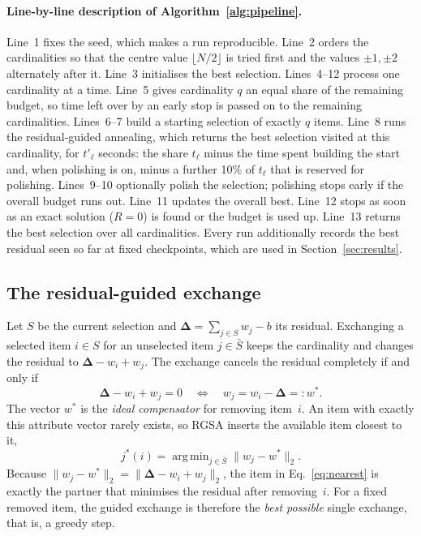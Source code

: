 \documentclass[pdflatex,sn-mathphys-num]{sn-jnl}
\theoremstyle{thmstyleone}
\theoremstyle{thmstylethree}
\newcommand{\res}{\boldsymbol{\Delta}}
\DeclareMathOperator*{\argmin}{arg\,min}
\begin{document}
\paragraph{Line-by-line description of Algorithm~\ref{alg:pipeline}.}
Line~1 fixes the seed, which makes a run reproducible. Line~2 orders the cardinalities so that the centre value $\lfloor N/2\rfloor$ is tried first and the values $\pm1,\pm2$ alternately after it. Line~3 initialises the best selection. Lines~4--12 process one cardinality at a time. Line~5 gives cardinality $q$ an equal share of the remaining budget, so time left over by an early stop is passed on to the remaining cardinalities. Lines~6--7 build a starting selection of exactly $q$ items. Line~8 runs the residual-guided annealing, which returns the best selection visited at this cardinality, for $t'_\ell$ seconds: the share $t_\ell$ minus the time spent building the start and, when polishing is on, minus a further 10\% of $t_\ell$ that is reserved for polishing. Lines~9--10 optionally polish the selection; polishing stops early if the overall budget runs out. Line~11 updates the overall best. Line~12 stops as soon as an exact solution ($R=0$) is found or the budget is used up. Line~13 returns the best selection over all cardinalities. Every run additionally records the best residual seen so far at fixed checkpoints, which are used in Section~\ref{sec:results}.

\subsection{The residual-guided exchange}\label{sec:guided}
Let $S$ be the current selection and $\res=\sum_{j\in S}w_j-b$ its residual. Exchanging a selected item $i\in S$ for an unselected item $j\in\bar S$ keeps the cardinality and changes the residual to $\res-w_i+w_j$. The exchange cancels the residual completely if and only if
\begin{equation}
  \res-w_i+w_j=0\quad\Longleftrightarrow\quad w_j=w_i-\res=:w^*. \label{eq:ideal}
\end{equation}
The vector $w^*$ is the \emph{ideal compensator} for removing item~$i$. An item with exactly this attribute vector rarely exists, so RGSA inserts the available item closest to it,
\begin{equation}
  j^*(i)=\argmin_{j\in\bar S}\|w_j-w^*\|_2. \label{eq:nearest}
\end{equation}
Because $\|w_j-w^*\|_2=\|\res-w_i+w_j\|_2$, the item in Eq.~\eqref{eq:nearest} is exactly the partner that minimises the residual after removing~$i$. For a fixed removed item, the guided exchange is therefore the \emph{best possible} single exchange, that is, a greedy step.
\end{document}
